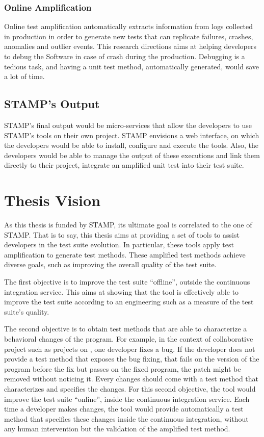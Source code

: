 \subsubsection{Online Amplification}
\label{subsubsec:intro:research-directions:online-ampl}

Online test amplification automatically extracts information from logs collected in production in order to generate new tests that can replicate failures, crashes, anomalies and outlier events.
This research directions aims at helping developers to debug the Software in case of crash during the production.
Debugging is a tedious task, and having a unit test method, automatically generated, would save a lot of time.

\subsection{STAMP's Output}

STAMP's final output would be micro-services that allow the developers to use STAMP's tools on their own project.
STAMP envisions a web interface, on which the developers would be able to install, configure and execute the tools.
Also, the developers would be able to manage the output of these executions and link them directly to their project, \eg integrate an amplified unit test into their test suite.

\section{Thesis Vision}
\label{sec:intro:vision}

As this thesis is funded by STAMP, its ultimate goal is correlated to the one of STAMP.
That is to say, this thesis aims at providing a set of tools to assist developers in the test suite evolution.
In particular,  these tools apply test amplification to generate test methods.
These amplified test methods achieve diverse goals, such as improving the overall quality of the test suite.

The first objective is to improve the test suite ``offline'', \ie outside the continuous integration service.
This aims at showing that the tool is effectively able to improve the test suite according to an engineering such as a measure of the test suite's quality.

The second objective is to obtain test methods that are able to characterize a behavioral changes of the program.
For example, in the context of collaborative project such as projects on \gh, one developer fixes a bug.
If the developer does not provide a test method that exposes the bug fixing, \ie that fails on the version of the program before the fix but passes on the fixed program, the patch might be removed without noticing it.
Every changes should come with a test method that characterizes and specifies the changes.
For this second objective, the tool would improve the test suite ``online'', \ie inside the continuous integration service.
Each time a developer makes changes, the tool would provide automatically a test method that specifies these changes inside the continuous integration, without any human intervention but the validation of the amplified test method.

